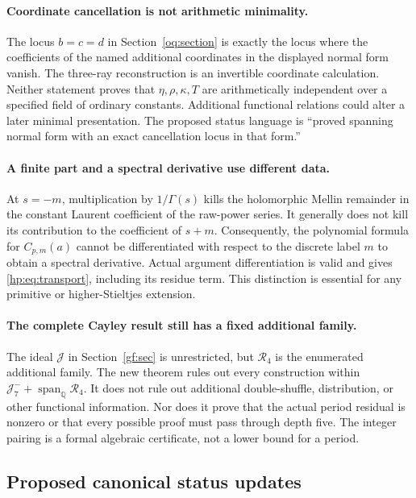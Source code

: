 \documentclass[11pt,a4paper]{article}
\numberwithin{equation}{section}
\theoremstyle{definition}
\theoremstyle{remark}
\begin{document}
\paragraph{Coordinate cancellation is not arithmetic minimality.}
The locus $b=c=d$ in Section~\ref{oq:section} is exactly the locus
where the coefficients of the named additional coordinates in the
displayed normal form vanish. The three-ray reconstruction is an
invertible coordinate calculation. Neither statement proves that
$\eta,\rho,\kappa,T$ are arithmetically independent over a specified
field of ordinary constants. Additional functional relations could
alter a later minimal presentation. The proposed status language is
``proved spanning normal form with an exact cancellation locus in that
form.''

\paragraph{A finite part and a spectral derivative use different data.}
At $s=-m$, multiplication by $1/\Gamma(s)$ kills the holomorphic
Mellin remainder in the constant Laurent coefficient of the raw-power
series. It generally does not kill its contribution to the coefficient
of $s+m$. Consequently, the polynomial formula for $C_{p,m}(a)$
cannot be differentiated with respect to the discrete label $m$ to
obtain a spectral derivative. Actual argument differentiation is valid
and gives \eqref{hp:eq:transport}, including its residue term. This
distinction is essential for any primitive or higher-Stieltjes
extension.

\paragraph{The complete Cayley result still has a fixed additional family.}
The ideal $\mathcal J$ in Section~\ref{gf:sec} is unrestricted, but
$\mathscr R_4$ is the enumerated additional family. The new theorem
rules out every construction within
$\mathcal J_7^-+\operatorname{span}_{\mathbb Q}\mathscr R_4$.
It does not rule out additional double-shuffle, distribution, or other
functional information. Nor does it prove that the actual period
residual is nonzero or that every possible proof must pass through
depth five. The integer pairing is a formal algebraic certificate,
not a lower bound for a period.

\subsection{Proposed canonical status updates}
\end{document}
